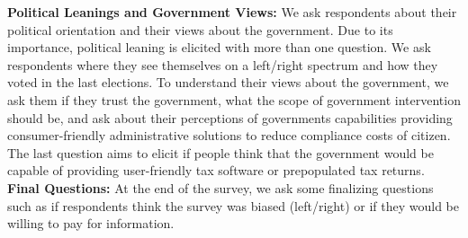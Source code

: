 \documentclass[11pt]{article}
\begin{document}
\textbf{Political Leanings and Government Views:} We ask respondents about their political orientation and their views about the government. Due to its importance, political leaning is elicited with more than one question. We ask respondents where they see themselves on a left/right spectrum and how they voted in the last elections. To understand their views about the government, we ask them if they trust the government, what the scope of government intervention should be, and ask about their perceptions of governments capabilities providing consumer-friendly administrative solutions to reduce compliance costs of citizen. The last question aims to elicit if people think that the government would be capable of providing user-friendly tax software or prepopulated tax returns. \\[0.5em]
\textbf{Final Questions:}
At the end of the survey, we ask some finalizing questions such as if respondents think the survey was biased (left/right) or if they would be willing to pay for information. 
\end{document}
